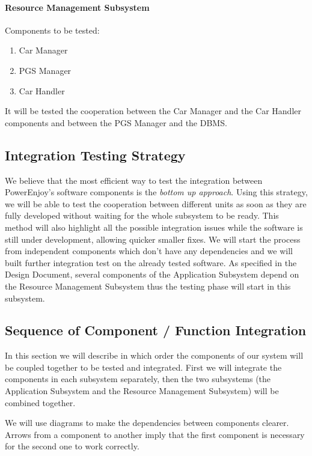 \documentclass[english]{article}
\begin{document}
\paragraph{Resource Management Subsystem}
Components to be tested:
\begin{enumerate}
\item Car Manager
\item PGS Manager
\item Car Handler
\end{enumerate}

It will be tested the cooperation between the Car Manager and the Car Handler components and between the PGS Manager and the DBMS.



\subsection{Integration Testing Strategy}
We believe that the most efficient way to test the integration between PowerEnjoy's software components is the \emph{bottom up approach}. Using this strategy, we will be able to test the cooperation between different units as soon as they are fully developed without waiting for the whole subsystem to be ready. This method will also highlight all the possible integration issues while the software is still under development, allowing quicker smaller fixes.
We will start the process from independent components which don't have any dependencies and we will built further integration test on the already  tested software.
As specified in the Design Document, several components of the Application Subsystem depend on the Resource Management Subsystem thus the testing phase will start in this subsystem.


\subsection{Sequence of Component / Function Integration}

In this section we will describe in which order the components of our system will be coupled together to be tested and integrated.
First we will integrate the components in each subsystem separately, then the two subsystems (the Application Subsystem and the Resource Management Subsystem) will be combined together.

We will use diagrams to make the dependencies between components clearer. Arrows from a component to another imply that the first component is necessary for the second one to work correctly.
\end{document}
